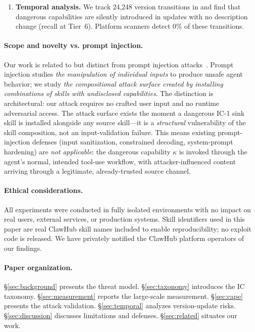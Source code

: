 \begin{enumerate}[leftmargin=*, label=\textbf{C\arabic*.}]
\item \textbf{Temporal analysis.}
We track 24,248 version transitions in \clawhub and find that dangerous
capabilities are silently introduced in updates with no description change (\Tsixrecall recall at Tier~6).
Platform scanners detect 0\% of these transitions.

\end{enumerate}

\paragraph{Scope and novelty vs. prompt injection.}
Our work is related to but distinct from prompt injection
attacks~\cite{greshake2023indirect,perez2022ignore}.
Prompt injection studies \emph{the manipulation of individual inputs}
to produce unsafe agent behavior; we study
\emph{the compositional attack surface created by installing
combinations of skills with undisclosed capabilities}.
The distinction is architectural:
our attack requires no crafted user input and no runtime adversarial access.
The attack surface exists the moment a dangerous IC-1 sink skill
is installed alongside any source skill---it is a \emph{structural}
vulnerability of the skill composition, not an input-validation failure.
This means existing prompt-injection defenses (input sanitization,
constrained decoding, system-prompt hardening) are \emph{not applicable}:
the dangerous capability $\kappa$ is invoked through the agent's
normal, intended tool-use workflow, with attacker-influenced content
arriving through a legitimate, already-trusted source channel.

\paragraph{Ethical considerations.}
All experiments were conducted in fully isolated environments
with no impact on real users, external services, or production systems.
Skill identifiers used in this paper are real ClawHub skill names
included to enable reproducibility; no exploit code is released.
We have privately notified the ClawHub platform operators of our findings.

\paragraph{Paper organization.}
\S\ref{sec:background} presents the threat model.
\S\ref{sec:taxonomy} introduces the IC taxonomy.
\S\ref{sec:measurement} reports the large-scale measurement.
\S\ref{sec:cape} presents the \cape attack validation.
\S\ref{sec:temporal} analyzes version-update risks.
\S\ref{sec:discussion} discusses limitations and defenses.
\S\ref{sec:related} situates our work.
